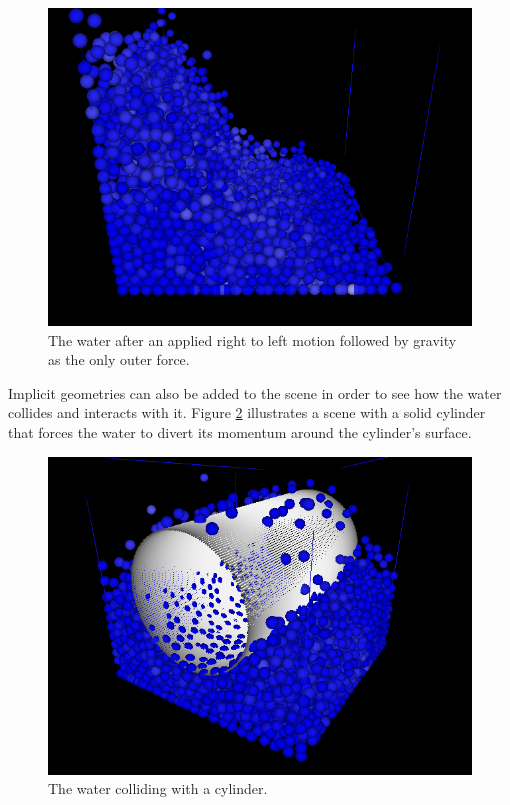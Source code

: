 	\begin{figure}[h!]
		\includegraphics[width=\linewidth]{img/frame0882.png}
		\caption{The water after an applied right to left motion followed by gravity as the only outer force.}
		\label{fig:res4}
	\end{figure}

    Implicit geometries can also be added to the scene in order to see how the water collides and interacts with it. Figure \ref{fig:res5} illustrates a scene with a solid cylinder that forces the water to divert its momentum around the cylinder's surface.

    \begin{figure}[h!]
        \includegraphics[width=\linewidth]{img/cylinder2.png}
        \caption{The water colliding with a cylinder.}
        \label{fig:res5}
    \end{figure}

